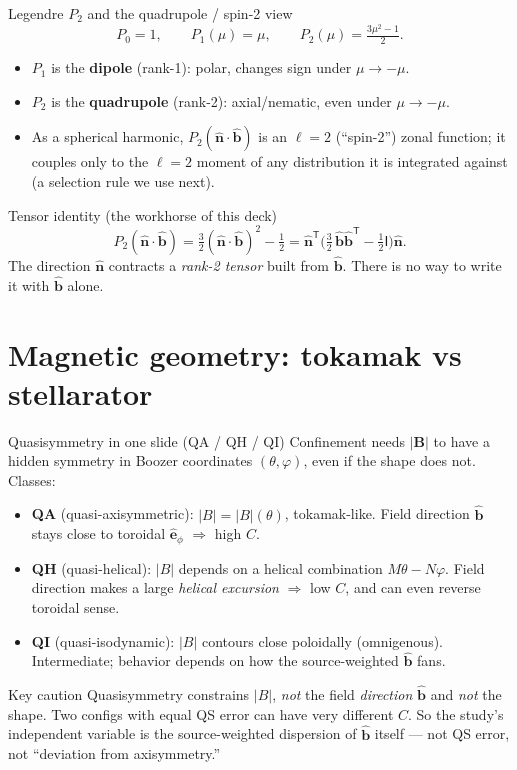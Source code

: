 \documentclass[aspectratio=169]{beamer}
\newcommand{\bn}{\hat{\bm n}}
\newcommand{\bb}{\hat{\bm b}}
\newcommand{\I}{\mathsf I}
\newcommand{\T}{\mathsf T}
\newcommand{\ephi}{\hat{\bm e}_\phi}
\begin{document}
\begin{frame}[t]{Legendre $P_2$ and the quadrupole / spin-2 view}
\[
P_0=1,\qquad P_1(\mu)=\mu,\qquad P_2(\mu)=\tfrac{3\mu^2-1}{2}.
\]
\begin{itemize}
  \item $P_1$ is the \textbf{dipole} (rank-1): polar, changes sign under $\mu\to-\mu$.
  \item $P_2$ is the \textbf{quadrupole} (rank-2): axial/nematic, even under $\mu\to-\mu$.
  \item As a spherical harmonic, $P_2(\bn\cdot\bb)$ is an $\ell=2$ (``spin-2'') zonal function; it couples only to the $\ell=2$ moment of any distribution it is integrated against (a selection rule we use next).
\end{itemize}
\begin{block}{Tensor identity (the workhorse of this deck)}
\[
P_2(\bn\cdot\bb)=\tfrac32(\bn\cdot\bb)^2-\tfrac12
= \bn^\T\!\Big(\tfrac32\,\bb\bb^\T-\tfrac12\I\Big)\bn .
\]
The direction $\bn$ contracts a \emph{rank-2 tensor} built from $\bb$. There is no way to write it with $\bb$ alone.
\end{block}
\end{frame}

\section{Magnetic geometry: tokamak vs stellarator}

\begin{frame}[t]{Quasisymmetry in one slide (QA / QH / QI)}
Confinement needs $|\bm B|$ to have a hidden symmetry in Boozer coordinates $(\theta,\varphi)$, even if the shape does not. Classes:
\begin{itemize}
  \item \textbf{QA} (quasi-axisymmetric): $|B|=|B|(\theta)$, tokamak-like. Field direction $\bb$ stays close to toroidal $\ephi$ $\Rightarrow$ high $C$.
  \item \textbf{QH} (quasi-helical): $|B|$ depends on a helical combination $M\theta-N\varphi$. Field direction makes a large \emph{helical excursion} $\Rightarrow$ low $C$, and can even reverse toroidal sense.
  \item \textbf{QI} (quasi-isodynamic): $|B|$ contours close poloidally (omnigenous). Intermediate; behavior depends on how the source-weighted $\bb$ fans.
\end{itemize}
\begin{block}{Key caution}
Quasisymmetry constrains $|B|$, \emph{not} the field \emph{direction} $\bb$ and \emph{not} the shape. Two configs with equal QS error can have very different $C$. So the study's independent variable is the source-weighted dispersion of $\bb$ itself --- not QS error, not ``deviation from axisymmetry.''
\end{block}
\end{frame}
\end{document}
